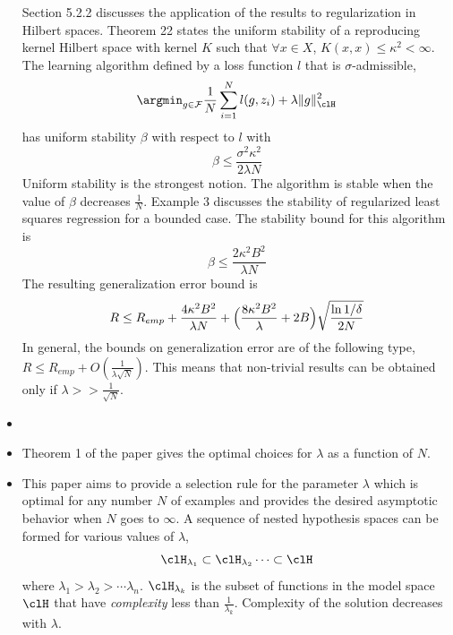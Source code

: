 \begin{itemize}
Section 5.2.2 discusses the application of the results to regularization in Hilbert spaces. Theorem 22 states the uniform stability of a reproducing kernel Hilbert space with kernel $K$ such that $\forall x \in X$, $K(x,x) \leq \kappa^2 < \infty$. The learning algorithm defined by a loss function $l$ that is $\sigma$-admissible, 
\[
\argmin_{g \in \mathcal{F}} \frac{1}{N} \sum_{i=1}^N l(g,z_i) + \lambda \|g\|^2_\clH
\]
has uniform stability $\beta$ with respect to $l$ with 
\[
\beta \leq \frac{\sigma^2 \kappa^2}{2 \lambda N}
\]
Uniform stability is the strongest notion. The algorithm is stable when the value of $\beta$ decreases $\frac{1}{N}$.
Example 3 discusses the stability of regularized least squares regression for a bounded case. The stability bound for this algorithm is
\[
\beta \leq \frac{2\kappa^2 B^2}{\lambda N}
\]
The resulting generalization error bound is 
\[
R \leq R_{emp} + \frac{4 \kappa^2 B^2}{\lambda N} + \Bigl(\frac{8 \kappa^2 B^2}{\lambda} + 2B \Bigr)\sqrt{\frac{\ln 1/\delta}{2N}}
\]
In general, the bounds on generalization error are of the following type, $ R \leq R_{emp} + O(\frac{1}{\lambda \sqrt{N}})$. This means that non-trivial results can be obtained only if $\lambda >> \frac{1}{\sqrt{N}}$.
\item {}

\item {}

Theorem 1 of the paper gives the optimal choices for $\lambda$ as a function of $N$. 

\item {}

This paper aims to provide a selection rule for the parameter $\lambda$ which is optimal for any number $N$ of examples and provides the desired asymptotic behavior when $N$ goes to $\infty$. A sequence of nested hypothesis spaces can be formed for various values of $\lambda$,
\[
\clH_{\lambda_1} \subset \clH_{\lambda_2} \cdots \subset \clH
\]
where $\lambda_1 > \lambda_2 > \cdots \lambda_n$. $\clH_{\lambda_k}$ is the subset of functions in the model space $\clH$ that have \textit{complexity} less than $\frac{1}{\lambda_k}$. Complexity of the solution decreases with $\lambda$.  


\end{itemize}
